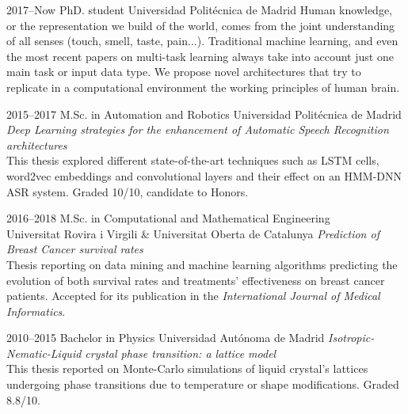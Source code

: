 \documentclass[]{friggeri-cv-a4}
\begin{document}
\begin{entrylist}


\entry
{2017--Now}
{PhD. student}
{Universidad Politécnica de Madrid}
{\small{Human knowledge, or the representation we build of the world, comes from the joint understanding of all senses (touch, smell, taste, pain...). Traditional machine learning, and even the most recent papers on multi-task learning always take into account just one main task or input data type. We propose novel architectures that try to replicate in a computational environment the working principles of human brain.}}


\entry
{2015--2017}
{M.Sc. {\normalfont in Automation and Robotics}}
{Universidad Politécnica de Madrid}
{\small{\emph{Deep Learning strategies for the enhancement of Automatic Speech Recognition architectures} }\\ This thesis explored different state-of-the-art techniques such as LSTM cells, word2vec embeddings and convolutional layers and their effect on an HMM-DNN ASR system. Graded 10/10, candidate to Honors.}


\entry
{2016--2018}
{M.Sc. {\normalfont in Computational and Mathematical Engineering}}
{\\Universitat Rovira i Virgili \& Universitat Oberta de Catalunya}
{\small{\emph{Prediction of Breast Cancer survival rates}} \\ Thesis reporting on data mining and machine learning algorithms predicting the evolution of both survival rates and treatments' effectiveness on breast cancer patients. Accepted for its publication in the \emph{International Journal of Medical Informatics}. }


\entry
{2010--2015}
{Bachelor {\normalfont in Physics}}
{Universidad Autónoma de Madrid}
{\small{\emph{Isotropic-Nematic-Liquid crystal phase transition: a lattice model}} \\ This thesis reported on Monte-Carlo simulations of liquid crystal's lattices undergoing phase transitions due to temperature or shape modifications. Graded 8.8/10.}


\end{entrylist}
\newpage
\end{document}
